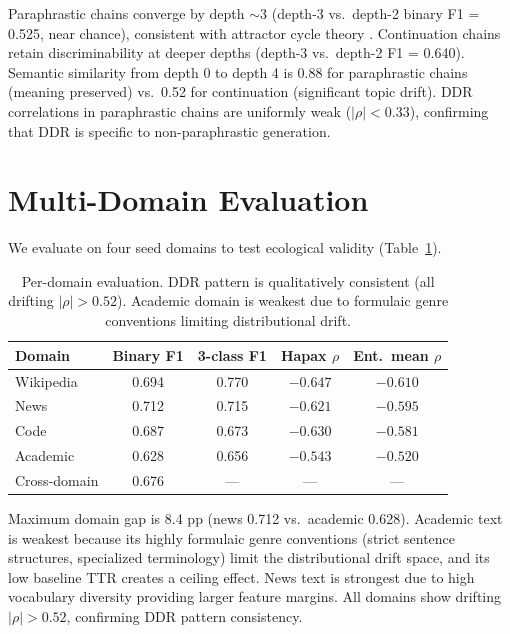 \documentclass[11pt,twocolumn]{article}
\begin{document}
Paraphrastic chains converge by depth $\sim$3 (depth-3 vs.\ depth-2 binary F1 = 0.525, near chance), consistent with attractor cycle theory \citep{briakou2025llm}.
Continuation chains retain discriminability at deeper depths (depth-3 vs.\ depth-2 F1 = 0.640).
Semantic similarity from depth 0 to depth 4 is 0.88 for paraphrastic chains (meaning preserved) vs.\ 0.52 for continuation (significant topic drift).
DDR correlations in paraphrastic chains are uniformly weak ($|\rho| < 0.33$), confirming that DDR is specific to non-paraphrastic generation.


\section{Multi-Domain Evaluation}
\label{sec:multidomain}

We evaluate on four seed domains to test ecological validity (Table~\ref{tab:domain}).

\begin{table}[h]
\centering
\small
\begin{tabular}{lcccc}
\toprule
\textbf{Domain} & \textbf{Binary F1} & \textbf{3-class F1} & \textbf{Hapax $\rho$} & \textbf{Ent.\ mean $\rho$} \\
\midrule
Wikipedia & 0.694 & 0.770 & $-0.647$ & $-0.610$ \\
News & 0.712 & 0.715 & $-0.621$ & $-0.595$ \\
Code & 0.687 & 0.673 & $-0.630$ & $-0.581$ \\
Academic & 0.628 & 0.656 & $-0.543$ & $-0.520$ \\
\midrule
Cross-domain & 0.676 & --- & --- & --- \\
\bottomrule
\end{tabular}
\caption{Per-domain evaluation. DDR pattern is qualitatively consistent (all drifting $|\rho| > 0.52$). Academic domain is weakest due to formulaic genre conventions limiting distributional drift.}
\label{tab:domain}
\end{table}

Maximum domain gap is 8.4 pp (news 0.712 vs.\ academic 0.628).
Academic text is weakest because its highly formulaic genre conventions (strict sentence structures, specialized terminology) limit the distributional drift space, and its low baseline TTR creates a ceiling effect.
News text is strongest due to high vocabulary diversity providing larger feature margins.
All domains show drifting $|\rho| > 0.52$, confirming DDR pattern consistency.
\end{document}
